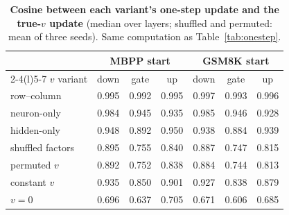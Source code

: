 \begin{table}[tbp]
\centering\small
\caption{\textbf{Cosine between each variant's one-step update and the true-$v$ update} (median over layers;
shuffled and permuted: mean of three seeds). Same computation as Table~\ref{tab:onestep}.}
\label{tab:onestep_cos}
\begin{tabular}{@{}lcccccc@{}}
\toprule
& \multicolumn{3}{c}{MBPP start} & \multicolumn{3}{c}{GSM8K start} \\
\cmidrule(lr){2-4}\cmidrule(l){5-7}
$v$ variant & down & gate & up & down & gate & up \\
\midrule
row--column & 0.995 & 0.992 & 0.995 & 0.997 & 0.993 & 0.996 \\
neuron-only & 0.984 & 0.945 & 0.935 & 0.985 & 0.946 & 0.928 \\
hidden-only & 0.948 & 0.892 & 0.950 & 0.938 & 0.884 & 0.939 \\
shuffled factors & 0.895 & 0.755 & 0.840 & 0.887 & 0.747 & 0.815 \\
permuted $v$ & 0.892 & 0.752 & 0.838 & 0.884 & 0.744 & 0.813 \\
constant $v$ & 0.935 & 0.850 & 0.901 & 0.927 & 0.838 & 0.879 \\
$v=0$ & 0.696 & 0.637 & 0.705 & 0.671 & 0.606 & 0.685 \\
\bottomrule
\end{tabular}
\end{table}
